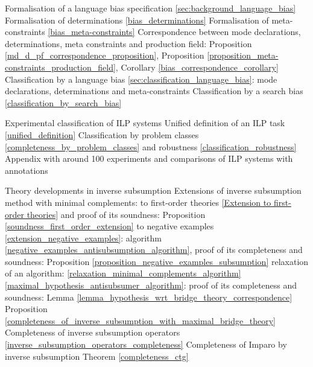 Formalisation of a language bias specification \ref{sec:background_language_bias}
Formalisation of determinations \ref{bias_determinations}
Formalisation of meta-constraints \ref{bias_meta-constraints}
Correspondence between mode declarations, determinations, meta constraints and production field: Proposition \ref{md_d_pf_correspondence_proposition}, Proposition \ref{proposition_meta-constraints_production_field}, Corollary \ref{bias_correspondence_corollary}
Classification by a language bias \ref{sec:classification_language_bias}: mode declarations, determinations and meta-constraints
Classification by a search bias \ref{classification_by_search_bias}

Experimental classification of ILP systems 
Unified definition of an ILP task \ref{unified_definition}
Classification by problem classes \ref{completeness_by_problem_classes} and robustness \ref{classification_robustness}
Appendix with around 100 experiments and comparisons of ILP systems with annotations

Theory developments in inverse subsumption
Extensions of inverse subsumption method with minimal complements:
to first-order theories \ref{Extension to first-order theories} and proof of its soundness: Proposition \ref{soundness_first_order_extension}
to negative examples \ref{extension_negative_examples}: algorithm \ref{negative_examples_antisubsumption_algorithm}, proof of its completeness and soundness: Proposition \ref{proposition_negative_examples_subsumption}
relaxation of an algorithm: \ref{relaxation_minimal_complements_algorithm} \ref{maximal_hypothesis_antisubsumer_algorithm}: proof of its completeness and soundness: Lemma \ref{lemma_hypothesis_wrt_bridge_theory_correspondence} Proposition \ref{completeness_of_inverse_subsumption_with_maximal_bridge_theory}
Completeness of inverse subsumption operators \ref{inverse_subsumption_operators_completeness}
Completeness of Imparo by inverse subsumption Theorem \ref{completeness_ctg}
